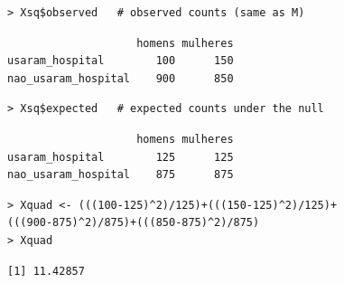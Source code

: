 \documentclass[14pt,aspectratio=1610]{beamer}
\begin{document}
\begin{frame}[fragile]{}
\begin{block}{}
\begin{verbatim}
> Xsq$observed   # observed counts (same as M)
\end{verbatim}

\begin{verbatim}
                    homens mulheres
usaram_hospital        100      150
nao_usaram_hospital    900      850    
\end{verbatim}

\begin{verbatim}
> Xsq$expected   # expected counts under the null    
\end{verbatim}


\begin{verbatim}
                    homens mulheres
usaram_hospital        125      125
nao_usaram_hospital    875      875    
\end{verbatim}

\begin{verbatim}
> Xquad <- (((100-125)^2)/125)+(((150-125)^2)/125)+
(((900-875)^2)/875)+(((850-875)^2)/875)
> Xquad    
\end{verbatim}
\begin{verbatim}
[1] 11.42857
\end{verbatim}

\end{block}    
\end{frame}
\end{document}
